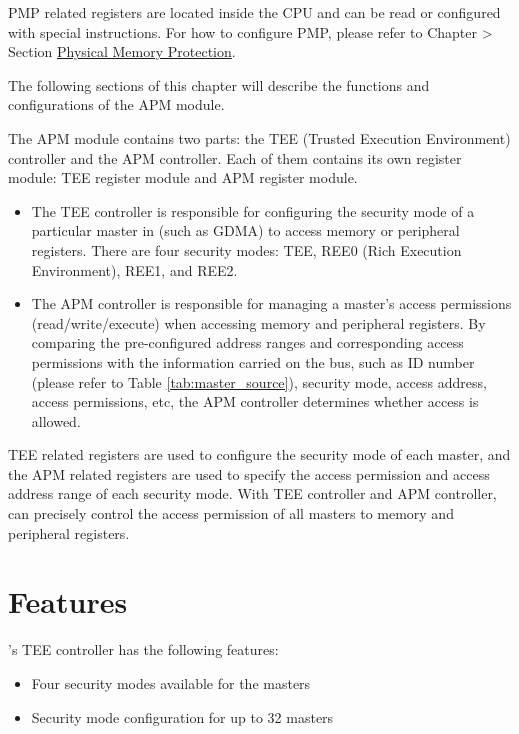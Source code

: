 \documentclass[main\_\_EN.tex]{subfiles}
\begin{document}
PMP related registers are located inside the CPU and can be read or configured with special instructions. For how to configure PMP, please refer to Chapter \textit{} > Section \hyperref[sec:riscvcpu-pmp]{Physical Memory Protection}.

The following sections of this chapter will describe the functions and configurations of the APM module.

The APM module contains two parts: the TEE (Trusted Execution Environment) controller and the APM controller. Each of them contains its own register module: TEE register module and APM register module.

\begin{itemize}
    \item The TEE controller is responsible for configuring the security mode of a particular master in \chipname{} (such as GDMA) to access memory or peripheral registers. There are four security modes: TEE, REE0 (Rich Execution Environment), REE1, and REE2.
    \item The APM controller is responsible for managing a master's access permissions (read/write/execute) when accessing memory and peripheral registers. By comparing the pre-configured address ranges and corresponding access permissions with the information carried on the bus, such as ID number (please refer to Table \ref{tab:master_source}), security mode, access address, access permissions, etc, the APM controller determines whether access is allowed.
\end{itemize}

TEE related registers are used to configure the security mode of each master, and the APM related registers are used to specify the access permission and access address range of each security mode. With TEE controller and APM controller, \chipname{} can precisely control the access permission of all masters to memory and peripheral registers.


\section{Features}\label{sec:permctrl-features}

\chipname{}'s TEE controller has the following features:

\begin{itemize}
    \item Four security modes available for the masters
    \item Security mode configuration for up to 32 masters

\end{itemize}
\end{document}
